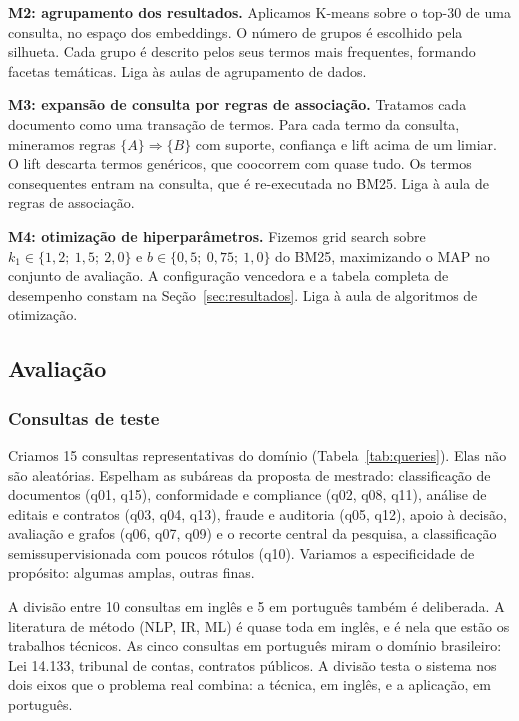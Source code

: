\documentclass[12pt]{article}
\begin{document}
\textbf{M2: agrupamento dos resultados.} Aplicamos K-means sobre o top-30 de uma consulta, no espaço dos embeddings. O número de grupos é escolhido pela silhueta. Cada grupo é descrito pelos seus termos mais frequentes, formando facetas temáticas. Liga às aulas de agrupamento de dados.

\textbf{M3: expansão de consulta por regras de associação.} Tratamos cada documento como uma transação de termos. Para cada termo da consulta, mineramos regras $\{A\} \Rightarrow \{B\}$ com suporte, confiança e lift acima de um limiar. O lift descarta termos genéricos, que coocorrem com quase tudo. Os termos consequentes entram na consulta, que é re-executada no BM25. Liga à aula de regras de associação.

\textbf{M4: otimização de hiperparâmetros.} Fizemos grid search sobre $k_1 \in \{1{,}2;\ 1{,}5;\ 2{,}0\}$ e $b \in \{0{,}5;\ 0{,}75;\ 1{,}0\}$ do BM25, maximizando o MAP no conjunto de avaliação. A configuração vencedora e a tabela completa de desempenho constam na Seção~\ref{sec:resultados}. Liga à aula de algoritmos de otimização.

\subsection{Avaliação}

\subsubsection{Consultas de teste}

Criamos 15 consultas representativas do domínio (Tabela~\ref{tab:queries}). Elas não são aleatórias. Espelham as subáreas da proposta de mestrado: classificação de documentos (q01, q15), conformidade e compliance (q02, q08, q11), análise de editais e contratos (q03, q04, q13), fraude e auditoria (q05, q12), apoio à decisão, avaliação e grafos (q06, q07, q09) e o recorte central da pesquisa, a classificação semissupervisionada com poucos rótulos (q10). Variamos a especificidade de propósito: algumas amplas, outras finas.

A divisão entre 10 consultas em inglês e 5 em português também é deliberada. A literatura de método (NLP, IR, ML) é quase toda em inglês, e é nela que estão os trabalhos técnicos. As cinco consultas em português miram o domínio brasileiro: Lei 14.133, tribunal de contas, contratos públicos. A divisão testa o sistema nos dois eixos que o problema real combina: a técnica, em inglês, e a aplicação, em português.
\end{document}
